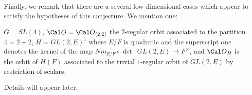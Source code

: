 Finally, we remark that there are a several low-dimensional cases which
appear to
satisfy the hypotheses of this conjecture. We mention one:

$G=SL(4)$, ${\Cal O}={\Cal O}_{(2,2)}$ the $2$-regular orbit associated
to the partition $4=2+2$, $H=GL(2,E)^1$ where $E/F$ is quadratic
and the superscript one denotes the kernel of the map
$Nm_{E/F}\circ \det :GL(2,E)\rightarrow F^{\times}$, and
${\Cal O}_H$ is the orbit of $H(F)$ associated to the
trivial $1$-regular orbit of $GL(2,E)$ by restriction of scalars.

Details will appear later.
\enddocument



